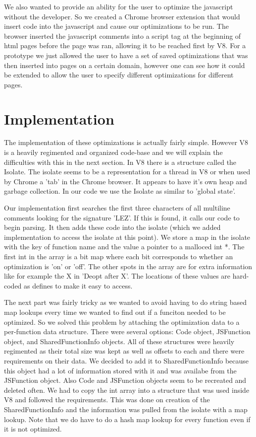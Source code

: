 \documentclass[twocolumn,showpacs,%
  nofootinbib,aps,superscriptaddress,%
  eqsecnum,prd,notitlepage,showkeys,10pt]{revtex4-1}
\begin{document}
We also wanted to provide an ability for the user to optimize the javascript without the developer. So we created a Chrome browser extension that would insert code into the javascript and cause our optimizations to be run. The browser inserted the javascript comments into a script tag at the beginning of html pages before the page was ran, allowing it to be reached first by V8. For a prototype we just allowed the user to have a set of saved optimizations that was then inserted into pages on a certain domain, however one can see how it could be extended to allow the user to specify different optimizations for different pages.

\section{Implementation}
The implementation of these optimizations is actually fairly simple. However V8 is a heavily regimented and organized code-base and we will explain the difficulties with this in the next section. In V8 there is a structure called the Isolate. The isolate seems to be a representation for a thread in V8 or when used by Chrome a 'tab' in the Chrome browser. It appears to have it's own heap and garbage collection. In our code we use the Isolate as similar to 'global state'.

Our implementation first searches the first three characters of all multiline comments looking for the signature 'LEZ'. If this is found, it calls our code to begin parsing. It then adds these code into the isolate (which we added implementation to access the isolate at this point). We store a map in the isolate with the key of function name and the value a pointer to a malloced int *. The first int in the array is a bit map where each bit corresponds to whether an optimization is 'on' or 'off'. The other spots in the array are for extra information like for example the X in 'Deopt after X'. The locations of these values are hard-coded as defines to make it easy to access.

The next part was fairly tricky as we wanted to avoid having to do string based map lookups every time we wanted to find out if a funciton needed to be optimized. So we solved this problem by attaching the optimization data to a per-function data structure. There were several options: Code object, JSFunction object, and SharedFunctionInfo objects. All of these structures were heavily regimented as their total size was kept as well as offsets to each and there were requirements on their data. We decided to add it to SharedFunctionInfo because this object had a lot of information stored with it and was availabe from the JSFunction object. Also Code and JSFunction objects seem to be recreated and deleted often. We had to copy the int array into a structure that was used inside V8 and followed the requirements. This was done on creation of the SharedFunctionInfo and the information was pulled from the isolate with a map lookup. Note that we do have to do a hash map lookup for every function even if it is not optimized.
\end{document}
